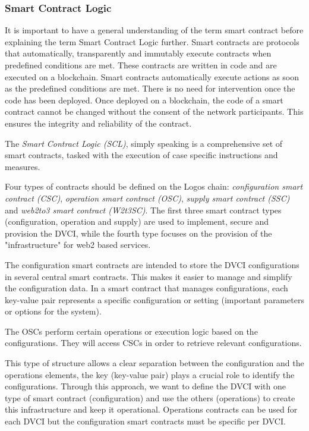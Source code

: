 \documentclass[]{article}
\begin{document}
\subsubsection{Smart Contract Logic}
It is important to have a general understanding of the term smart contract \cite{SubstrateDoc-sc} before explaining the term Smart Contract Logic further.
Smart contracts are protocols that automatically, transparently and immutably execute contracts when predefined conditions are met. 
These contracts are written in code and are executed on a blockchain.
Smart contracts automatically execute actions as soon as the predefined conditions are met. 
There is no need for intervention once the code has been deployed.
Once deployed on a blockchain, the code of a smart contract cannot be changed without the consent of the network participants. 
This ensures the integrity and reliability of the contract.

The \textit{Smart Contract Logic (SCL)}, simply speaking is a comprehensive set of smart contracts, tasked with the execution of case specific instructions and measures.

Four types of contracts should be defined on the Logos chain:
\textit{configuration smart contract (CSC)}, \textit{operation smart contract (OSC)}, \textit{supply smart contract (SSC)} and \textit{web2to3 smart contract (W2t3SC)}. 
The first three smart contract types (configuration, operation and supply) are used to implement, secure and provision the DVCI, while the fourth type focuses on the provision of the "infrastructure" for web2 based services. 

The configuration smart contracts are intended to store the DVCI configurations in several central smart contracts. 
This makes it easier to manage and simplify the configuration data.
In a smart contract that manages configurations, each key-value pair represents a specific configuration or setting (important parameters or options for the system).

The OSCs perform certain operations or execution logic based on the configurations.
They will access CSCs in order to retrieve relevant configurations.

This type of structure allows a clear separation between the configuration and the operations elements, the key (key-value pair) plays a crucial role to identify the configurations.
Through this approach, we want to define the DVCI with one type of smart contract (configuration) and use the others (operations) to create this infrastructure and keep it operational.
Operations contracts can be used for each DVCI but the configuration smart contracts must be specific per DVCI.
\end{document}
